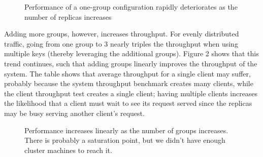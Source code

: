 \documentclass[letterpaper,10pt]{article}
\begin{document}
\begin{itemize}
\begin{figure}[h]
\centering
{}
\caption{Performance of a one-group configuration rapidly deteriorates as the number of replicas increases}
\label{fig:replicas}
\end{figure}

Adding more groups, however, increases throughput.  For evenly distributed traffic, going from one group to 3 nearly triples the throughput when using multiple keys (thereby leveraging the additional groups).  Figure 2 shows that this trend continues, such that adding groups linearly improves the throughput of the system. The table shows that average throughput for a single client may suffer, probably because the system throughput benchmark creates many clients, while the client throughput test creates a single client; having multiple clients increases the likelihood that a client must wait to see its request served since the replicas may be busy serving another client's request.

\begin{figure}[h]
\centering
{}
\caption{Performance increases linearly as the number of groups increases. There is probably a saturation point, but we didn't have enough cluster machines to reach it.}
\label{fig:groups}
\end{figure}


\end{itemize}
\end{document}
